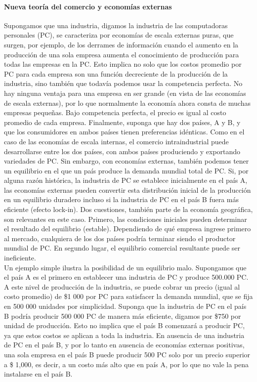 \paragraph{Nueva teoría del comercio y economías externas}
Supongamos que una industria, digamos la industria de las computadoras personales (PC), se caracteriza por economías de escala externas puras, que surgen, por ejemplo, de los derrames de información cuando el aumento en la producción de una sola empresa aumenta el conocimiento de producción para todas las empresas en la PC. Esto implica no solo que los costos promedio por PC para cada empresa son una función decreciente de la producción de la industria, sino también que todavía podemos usar la competencia perfecta. No hay ninguna ventaja para una empresa en ser grande (en vista de las economías de escala externas), por lo que normalmente la economía ahora consta de muchas empresas pequeñas. Bajo competencia perfecta, el precio es igual al costo promedio de cada empresa. Finalmente, suponga que hay dos países, A y B, y que los consumidores en ambos países tienen preferencias idénticas. Como en el caso de las economías de escala internas, el comercio intraindustrial puede desarrollarse entre los dos países, con ambos países produciendo y exportando variedades de PC. Sin embargo, con economías externas, también podemos tener un equilibrio en el que un país produce la demanda mundial total de PC. Si, por alguna razón histórica, la industria de PC se establece inicialmente en el país A, las economías externas pueden convertir esta distribución inicial de la producción en un equilibrio duradero incluso si la industria de PC en el país B fuera más eficiente (efecto lock-in). Dos cuestiones, también parte de la economía geográfica, son relevantes en este caso. Primero, las condiciones iniciales pueden determinar el resultado del equilibrio (estable). Dependiendo de qué empresa ingrese primero al mercado, cualquiera de los dos países podría terminar siendo el productor mundial de PC. En segundo lugar, el equilibrio comercial resultante puede ser ineficiente.\\
Un ejemplo simple ilustra la posibilidad de un equilibrio malo. Supongamos que el país A es el primero en establecer una industria de PC y produce 500.000 PC. A este nivel de producción de la industria, se puede cobrar un precio (igual al costo promedio) de \$1 000 por PC para satisfacer la demanda mundial, que se fija en 500 000 unidades por simplicidad. Suponga que la industria de PC en el país B podría producir 500 000 PC de manera más eficiente, digamos por \$750 por unidad de producción. Esto no implica que el país B comenzará a producir PC, ya que estos costos se aplican a toda la industria. En ausencia de una industria de PC en el país B, y por lo tanto en ausencia de economías externas positivas, una sola empresa en el país B puede producir 500 PC solo por un precio superior a \$ 1,000, es decir, a un costo más alto que en país A, por lo que no vale la pena instalarse en el país B.\\
